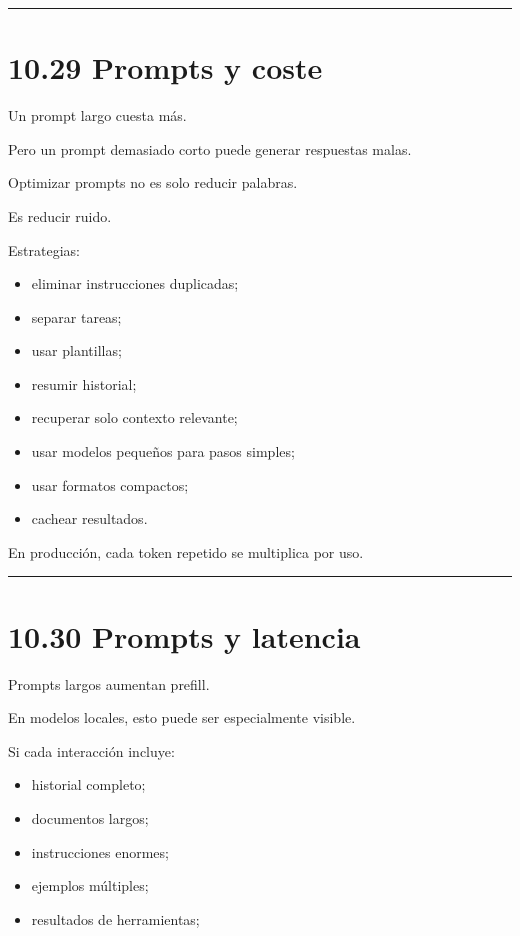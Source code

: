 \begin{center}\rule{0.5\linewidth}{0.5pt}\end{center}

\section{10.29 Prompts y coste}\label{prompts-y-coste}

Un prompt largo cuesta más.

Pero un prompt demasiado corto puede generar respuestas malas.

Optimizar prompts no es solo reducir palabras.

Es reducir ruido.

Estrategias:

\begin{itemize}
\tightlist
\item
  eliminar instrucciones duplicadas;
\item
  separar tareas;
\item
  usar plantillas;
\item
  resumir historial;
\item
  recuperar solo contexto relevante;
\item
  usar modelos pequeños para pasos simples;
\item
  usar formatos compactos;
\item
  cachear resultados.
\end{itemize}

En producción, cada token repetido se multiplica por uso.

\begin{center}\rule{0.5\linewidth}{0.5pt}\end{center}

\section{10.30 Prompts y latencia}\label{prompts-y-latencia}

Prompts largos aumentan prefill.

En modelos locales, esto puede ser especialmente visible.

Si cada interacción incluye:

\begin{itemize}
\tightlist
\item
  historial completo;
\item
  documentos largos;
\item
  instrucciones enormes;
\item
  ejemplos múltiples;
\item
  resultados de herramientas;
\end{itemize}

